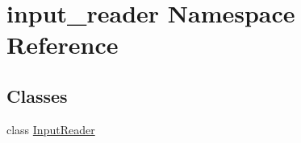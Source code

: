 \hypertarget{namespaceinput__reader}{}\section{input\+\_\+reader Namespace Reference}
\label{namespaceinput__reader}
\subsection*{Classes}
\begin{DoxyCompactItemize}
\item 
class \mbox{\hyperlink{classinput__reader_1_1_input_reader}{Input\+Reader}}
\end{DoxyCompactItemize}
